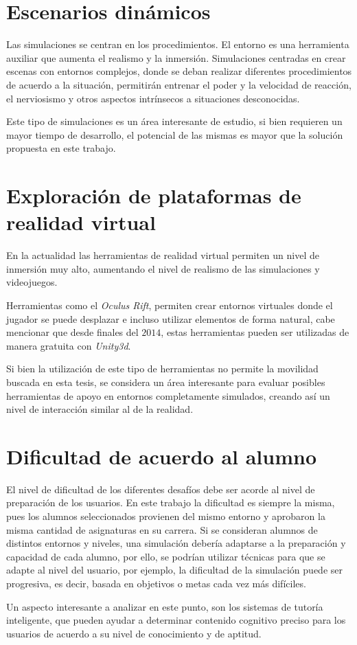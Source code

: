 \section{Escenarios dinámicos}

Las simulaciones se centran en los procedimientos. El entorno es una herramienta
auxiliar que aumenta el realismo y la inmersión. Simulaciones centradas en crear
escenas con entornos complejos, donde se deban realizar diferentes
procedimientos de acuerdo a la situación, permitirán entrenar el poder y la
velocidad de reacción, el nerviosismo y otros aspectos intrínsecos a situaciones
desconocidas. 

Este tipo de simulaciones es un área interesante de estudio, si bien requieren
un mayor tiempo de desarrollo, el potencial de las mismas es mayor que la
solución propuesta en este trabajo. 

\section{Exploración de plataformas de realidad virtual}

En la actualidad las herramientas de realidad virtual permiten un nivel de
inmersión muy alto, aumentando el nivel de realismo de las simulaciones y
videojuegos.     

Herramientas como el \emph{Oculus Rift}, permiten crear entornos virtuales donde
el jugador se puede desplazar e incluso utilizar elementos de forma
natural\cite{makerbot}, cabe mencionar que desde finales del $2014$, estas
herramientas pueden ser utilizadas de manera gratuita con
\emph{Unity3d}\cite{unity:vr}.

Si bien la utilización de este tipo de herramientas no permite la movilidad 
buscada en esta tesis, se considera un área interesante para evaluar posibles
herramientas de apoyo en entornos completamente simulados, creando así un nivel
de interacción similar al de la realidad.


\section{Dificultad de acuerdo al alumno}

El nivel de dificultad de los diferentes desafíos debe ser acorde al nivel de
preparación de los usuarios. En este trabajo la dificultad es siempre la misma,
pues los alumnos seleccionados provienen del mismo entorno y aprobaron la misma
cantidad de asignaturas en su carrera. Si se consideran alumnos de distintos
entornos y niveles, una simulación debería adaptarse a la preparación y
capacidad de cada alumno, por ello, se podrían utilizar técnicas para que se
adapte al nivel del usuario, por ejemplo, la dificultad de la simulación puede
ser progresiva, es decir, basada en objetivos o metas cada vez más difíciles.

Un aspecto interesante a analizar en este punto, son los sistemas de tutoría
inteligente, que pueden ayudar a determinar contenido cognitivo preciso para los
usuarios de acuerdo a su nivel de conocimiento y de aptitud.
